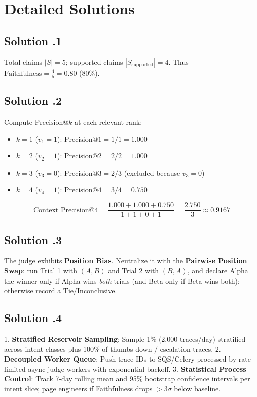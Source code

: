 \section{Detailed Solutions}

\subsection*{Solution \thechapter.1}
Total claims $|S| = 5$; supported claims $|S_{\text{supported}}| = 4$. Thus $\text{Faithfulness} = \frac{4}{5} = 0.80$ (80\%).

\subsection*{Solution \thechapter.2}
Compute $\text{Precision@}k$ at each relevant rank:
\begin{itemize}
  \item $k=1$ ($v_1=1$): $\text{Precision@1} = 1/1 = 1.000$
  \item $k=2$ ($v_2=1$): $\text{Precision@2} = 2/2 = 1.000$
  \item $k=3$ ($v_3=0$): $\text{Precision@3} = 2/3$ (excluded because $v_3=0$)
  \item $k=4$ ($v_4=1$): $\text{Precision@4} = 3/4 = 0.750$
\end{itemize}
\[
\text{Context\_Precision@4} = \frac{1.000 + 1.000 + 0.750}{1 + 1 + 0 + 1} = \frac{2.750}{3} \approx 0.9167
\]

\subsection*{Solution \thechapter.3}
The judge exhibits \textbf{Position Bias}. Neutralize it with the \textbf{Pairwise Position Swap}: run Trial 1 with $(A, B)$ and Trial 2 with $(B, A)$, and declare Alpha the winner only if Alpha wins \emph{both} trials (and Beta only if Beta wins both); otherwise record a Tie/Inconclusive.

\subsection*{Solution \thechapter.4}
1. \textbf{Stratified Reservoir Sampling}: Sample 1\% (2,000 traces/day) stratified across intent classes plus 100\% of thumbs-down / escalation traces. 2. \textbf{Decoupled Worker Queue}: Push trace IDs to SQS/Celery processed by rate-limited async judge workers with exponential backoff. 3. \textbf{Statistical Process Control}: Track 7-day rolling mean and 95\% bootstrap confidence intervals per intent slice; page engineers if Faithfulness drops $>3\sigma$ below baseline.

